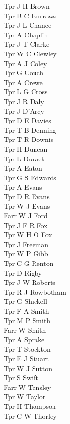 \begin{multicols}{3}
  Tpr J H Brown \\
  Tpr B C Burrows \\
  Tpr J L Chance \\
  Tpr A Chaplin \\
  Tpr J T Clarke \\
  Tpr W C Clewley \\
  Tpr A J Coley \\
  Tpr G Couch \\
  Tpr A Crewe \\
  Tpr L G Cross \\
  Tpr J R Daly \\
  Tpr J D'Arcy \\
  Tpr D E Davies \\
  Tpr T B Denning \\
  Tpr T R Downie \\
  Tpr H Duncan \\
  Tpr L Durack \\
  Tpr A Eaton \\
  Tpr G S Edwards \\
  Tpr A Evans \\
  Tpr D R Evans \\
  Tpr W J Evans \\
  Farr W J Ford \\
  Tpr J F R Fox \\
  Tpr W H O Fox \\
  Tpr J Freeman \\
  Tpr W P Gibb \\
  Tpr C G Renton \\
  Tpr D Rigby \\
  Tpr J W Roberts \\
  Tpr R J Rowbotham \\
  Tpr G Shickell \\
  Tpr F A Smith \\
  Tpr M P Smith \\
  Farr W Smith \\
  Tpr A Sprake \\
  Tpr T Stockton \\
  Tpr E J Stuart \\
  Tpr W J Sutton \\
  Tpr S Swift \\
  Farr W Tansley \\
  Tpr W Taylor \\
  Tpr H Thompson \\
  Tpr C W Thorley \\

\end{multicols}
